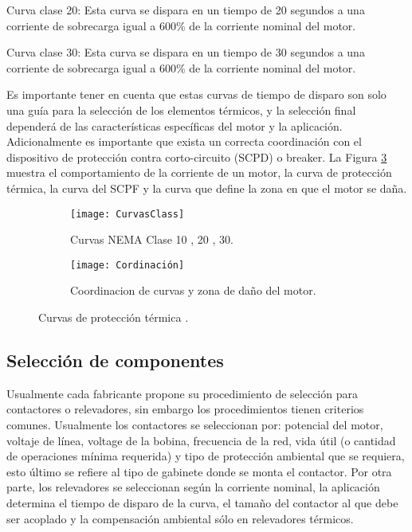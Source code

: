 Curva clase 20: Esta curva se dispara en un tiempo de 20 segundos a una corriente de sobrecarga igual a 600\% de la corriente nominal del motor.

Curva clase 30: Esta curva se dispara en un tiempo de 30 segundos a una corriente de sobrecarga igual a 600\% de la corriente nominal del motor.

Es importante tener en cuenta que estas curvas de tiempo de disparo son solo una guía para la selección de los elementos térmicos, y la selección final dependerá de las características específicas del motor y la aplicación. Adicionalmente es importante que exista un correcta coordinación con el dispositivo de protección contra corto-circuito (SCPD) o breaker. La Figura \ref{fig:cordinacion} muestra el comportamiento de la corriente de un motor, la curva de protección térmica, la curva del SCPF y la curva que define la zona en que el motor se daña.

\begin{figure}
	\centering
	\begin{subfigure}[b]{0.48\textwidth}
		\centering
	\texttt{[image: CurvasClass]}
	\caption{Curvas NEMA Clase 10 , 20 , 30.}
	\label{fig:curvasclass}
	\end{subfigure}
	\hfill
	\begin{subfigure}[b]{0.5\textwidth}
		\centering
		\texttt{[image: Cordinación]}
		\caption{Coordinacion de curvas y zona de daño del motor.}
		\label{fig:cordinacion}
	\end{subfigure}
	\caption{Curvas de protección térmica \cite{Scheneider}.}
\end{figure}


\subsection{Selección de componentes}

Usualmente cada fabricante propone su procedimiento de selección para contactores o relevadores, sin embargo los procedimientos tienen criterios comunes. Usualmente los contactores se seleccionan por: potencial del motor, voltaje de línea, voltage de la bobina, frecuencia de la red, vida útil (o cantidad de operaciones mínima requerida) y tipo de protección ambiental que se requiera, esto último se refiere al tipo de gabinete donde se monta el contactor. 
Por otra parte, los relevadores se seleccionan según la corriente nominal, la aplicación determina el tiempo de disparo de la curva, el tamaño del contactor al que debe ser acoplado y la compensación ambiental sólo en relevadores térmicos.  


